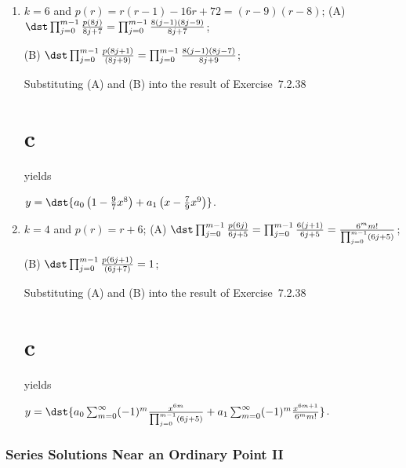\documentclass[openany]{book}
\newenvironment{sectionSolutions}{
 \begin{enumerate}[item-label={\thesection.\arabic{enumi}.}]
}{
 \end{enumerate}
}
\begin{document}
\begin{sectionSolutions}
$y=\dst{a_0\sum_{m=0}^\infty
(-1)^m\frac{x^{4m}}{4^mm!\prod_{j=0}^{m-1}(4j+3)}+a_1\sum_{m=0}^\infty
(-1)^m\frac{x^{4m+1}}{4^mm!\prod_{j=0}^{m-1}(4j+5)}}$.



\item $k=6$ and
$p(r)=r(r-1)-16r+72=(r-9)(r-8) $;
(A) $\dst\prod_{j=0}^{m-1}\frac{p(8j)}{8j+7}=
\prod_{j=0}^{m-1}\frac{8(j-1)(8j-9)}{8j+7}$;


(B) $\dst\prod_{j=0}^{m-1}\frac{p(8j+1)}{(8j+9)}=
\prod_{j=0}^{m-1}\frac{8(j-1)(8j-7)}{8j+9}$;

Substituting (A) and (B) into the
result of Exercise~7.2.38\part{c} yields


$y=\dst{a_0\left(1-\frac{9}{7}x^8\right)+a_1\left(x-\frac{7}{9}x^9\right)}$.



\item $k=4$ and
$p(r)=r+6$;
(A) $\dst\prod_{j=0}^{m-1}\frac{p(6j)}{6j+5}=
\prod_{j=0}^{m-1}\frac{6(j+1)}{6j+5}=\frac{6^mm!}{\prod_{j=0}^{m-1}
(6j+5)}$;


(B) $\dst\prod_{j=0}^{m-1}\frac{p(6j+1)}{(6j+7)}=1$;

Substituting (A) and (B) into the
result of Exercise~7.2.38\part{c} yields


$y=\dst{a_0\sum_{m=0}^\infty(-1)^m\frac{x^{6m}}{\prod_{j=0}^{m-1}(6j+5)}+
a_1\sum_{m=0}^\infty(-1)^m\frac{x^{6m+1}}{6^mm!}}$.

\end{sectionSolutions}

\section{Series Solutions Near an Ordinary Point II}
\end{document}
